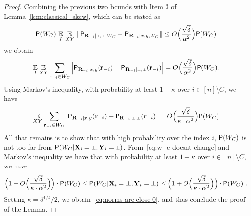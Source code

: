 \begin{proof}
Combining the previous two bounds with Item 3 of Lemma~\ref{lem:classical_skew}, which can be stated as
$$
\P(W_C) \, \Ex_I \, \Ex_{XY} \,\|\P_{\bR_\mi | \dummy, \dummy, W_C} - \P_{\bR_\mi | x,y, W_C} \| \leq O\Big(\frac{\sqrt{\delta}}{\alpha^2}\Big) \P(W_C)
$$ 
we obtain 
$$\Ex_I \Ex_{XY} \sum_{\br_\mi \in W_C}  \Big | \P_{\bR_\mi | x,y}(\br_\mi) - \P_{\bR_\mi | \dummy, \dummy}(\br_\mi) \Big | = O\Big(\frac{\sqrt{\delta}}{\alpha^2}\Big) \P(W_C).$$ 
Using Markov's inequality, with probability at least $1 - \kappa$ over $i \in [n] \setminus C$, we have
\[
\Ex_{XY} \sum_{\br_\mi \in W_C}  \Big | \P_{\bR_\mi | x,y}(\br_\mi) - \P_{\bR_\mi | \dummy, \dummy}(\br_\mi) \Big | = O\Big(\frac{\sqrt{\delta}}{\kappa \cdot \alpha^2}\Big) \P(W_C)
\]
All that remains is to show that with high probability over the index $i$, $\P(W_C)$ is not too far from $\P(W_C | \bX_i = \dummy, \bY_i = \dummy)$. From~\eqref{eq:w_c-doesnt-change} and Markov's inequality we have that with probability at least $1 - \kappa$ over $i \in [n] \setminus C$, we have 
\[
	\Big (1 - O\Big(\frac{\sqrt{\delta}}{\kappa \cdot \alpha^2}\Big) \Big)  \cdot \P(W_C) \leq \P (W_C| \bX_i = \dummy,\bY_i = \dummy) \leq \Big (1 + O\Big(\frac{\sqrt{\delta}}{\kappa \cdot \alpha^2}\Big) \Big) \cdot \P(W_C)~.
\]
Setting $\kappa = \delta^{1/4}/2$, we obtain~\eqref{eq:norms-are-close-0}, and thus conclude the proof of the Lemma.
\end{proof}


